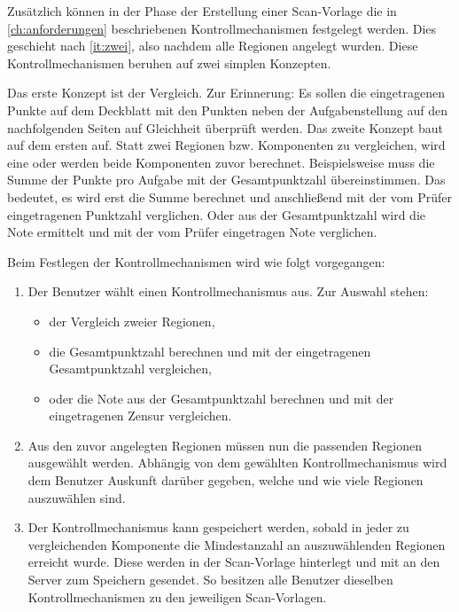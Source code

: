 \documentclass[notables, nomenclature, oneside, 150]{HSMW-Thesis}
\begin{document}
 		Zusätzlich können in der Phase der Erstellung einer Scan-Vorlage die in \autoref{ch:anforderungen} beschriebenen Kontrollmechanismen festgelegt werden. Dies geschieht nach \autoref{it:zwei}, also nachdem alle Regionen angelegt wurden. Diese Kontrollmechanismen beruhen auf zwei simplen Konzepten. 

 		Das erste Konzept ist der Vergleich. Zur Erinnerung: Es sollen die eingetragenen Punkte auf dem Deckblatt mit den Punkten neben der Aufgabenstellung auf den nachfolgenden Seiten auf Gleichheit überprüft werden. Das zweite Konzept baut auf dem ersten auf. Statt zwei Regionen bzw. Komponenten zu vergleichen, wird eine oder werden beide Komponenten zuvor berechnet. Beispielsweise muss die Summe der Punkte pro Aufgabe mit der Gesamtpunktzahl übereinstimmen. Das bedeutet, es wird erst die Summe berechnet und anschließend mit der vom Prüfer eingetragenen Punktzahl verglichen. Oder aus der Gesamtpunktzahl wird die Note ermittelt und mit der vom Prüfer eingetragen Note verglichen. 
 	
 		Beim Festlegen der Kontrollmechanismen wird wie folgt vorgegangen:
 		\vspace{-5mm}
 		\begin{enumerate}
 			\item Der Benutzer wählt einen Kontrollmechanismus aus. Zur Auswahl stehen:
 				\vspace{-5mm}
 				\begin{itemize}
 					\item der Vergleich zweier Regionen,
 					\item die Gesamtpunktzahl berechnen und mit der eingetragenen Gesamtpunktzahl vergleichen,
 					\item oder die Note aus der Gesamtpunktzahl berechnen und mit der eingetragenen Zensur vergleichen.
 				\end{itemize}
 			\item Aus den zuvor angelegten Regionen müssen nun die passenden Regionen ausgewählt werden. Abhängig von dem gewählten Kontrollmechanismus wird dem Benutzer Auskunft darüber gegeben, welche und wie viele Regionen auszuwählen sind.
 			\item Der Kontrollmechanismus kann gespeichert werden, sobald in jeder zu vergleichenden Komponente die Mindestanzahl an auszuwählenden Regionen erreicht wurde. Diese werden in der Scan-Vorlage hinterlegt und mit an den Server zum Speichern gesendet. So besitzen alle Benutzer dieselben Kontrollmechanismen  zu den jeweiligen Scan-Vorlagen.
 		\end{enumerate}
\end{document}
